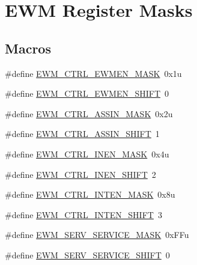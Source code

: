 \hypertarget{group___e_w_m___register___masks}{}\section{E\+WM Register Masks}
\label{group___e_w_m___register___masks}
\subsection*{Macros}
\begin{DoxyCompactItemize}
\item 
\#define \hyperlink{group___e_w_m___register___masks_ga7426f0a484ad28b92efb90ef0e3f01fd}{E\+W\+M\+\_\+\+C\+T\+R\+L\+\_\+\+E\+W\+M\+E\+N\+\_\+\+M\+A\+SK}~0x1u
\item 
\#define \hyperlink{group___e_w_m___register___masks_gafac96f184ce423d5872e0ca6e258d004}{E\+W\+M\+\_\+\+C\+T\+R\+L\+\_\+\+E\+W\+M\+E\+N\+\_\+\+S\+H\+I\+FT}~0
\item 
\#define \hyperlink{group___e_w_m___register___masks_ga24fe6289cbd9e813f99fb721d28b7bb5}{E\+W\+M\+\_\+\+C\+T\+R\+L\+\_\+\+A\+S\+S\+I\+N\+\_\+\+M\+A\+SK}~0x2u
\item 
\#define \hyperlink{group___e_w_m___register___masks_gac397960fb320e62f5c89e057e9f5ce13}{E\+W\+M\+\_\+\+C\+T\+R\+L\+\_\+\+A\+S\+S\+I\+N\+\_\+\+S\+H\+I\+FT}~1
\item 
\#define \hyperlink{group___e_w_m___register___masks_ga4366a1e4b346e8a61898588faa0ca7df}{E\+W\+M\+\_\+\+C\+T\+R\+L\+\_\+\+I\+N\+E\+N\+\_\+\+M\+A\+SK}~0x4u
\item 
\#define \hyperlink{group___e_w_m___register___masks_ga64cbcf45aac428b81d2ed6aab3cd0fe2}{E\+W\+M\+\_\+\+C\+T\+R\+L\+\_\+\+I\+N\+E\+N\+\_\+\+S\+H\+I\+FT}~2
\item 
\#define \hyperlink{group___e_w_m___register___masks_gab5aba63161ed0c5524fff6007d84f06b}{E\+W\+M\+\_\+\+C\+T\+R\+L\+\_\+\+I\+N\+T\+E\+N\+\_\+\+M\+A\+SK}~0x8u
\item 
\#define \hyperlink{group___e_w_m___register___masks_gae89666da54b9dba35d0ac6e74542413d}{E\+W\+M\+\_\+\+C\+T\+R\+L\+\_\+\+I\+N\+T\+E\+N\+\_\+\+S\+H\+I\+FT}~3
\item 
\#define \hyperlink{group___e_w_m___register___masks_ga45e5d6d64deeb807800e044bb82f318f}{E\+W\+M\+\_\+\+S\+E\+R\+V\+\_\+\+S\+E\+R\+V\+I\+C\+E\+\_\+\+M\+A\+SK}~0x\+F\+Fu
\item 
\#define \hyperlink{group___e_w_m___register___masks_ga4aacdb92f0d1a2edcdf651328e741c6a}{E\+W\+M\+\_\+\+S\+E\+R\+V\+\_\+\+S\+E\+R\+V\+I\+C\+E\+\_\+\+S\+H\+I\+FT}~0

\end{DoxyCompactItemize}

